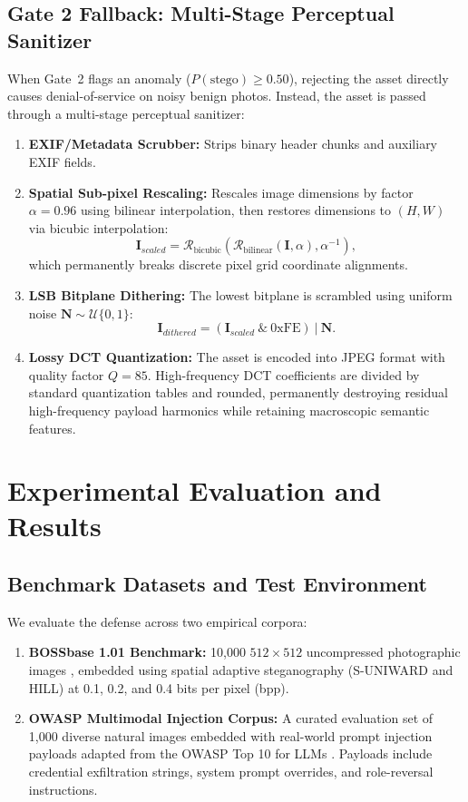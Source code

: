 \documentclass[conference]{IEEEtran}
\begin{document}
\subsection{Gate 2 Fallback: Multi-Stage Perceptual Sanitizer}
When Gate~2 flags an anomaly ($P(\text{stego}) \ge 0.50$), rejecting the asset directly causes denial-of-service on noisy benign photos. Instead, the asset is passed through a multi-stage perceptual sanitizer:
\begin{enumerate}
    \item \textbf{EXIF/Metadata Scrubber:} Strips binary header chunks and auxiliary EXIF fields.
    \item \textbf{Spatial Sub-pixel Rescaling:} Rescales image dimensions by factor $\alpha = 0.96$ using bilinear interpolation, then restores dimensions to $(H, W)$ via bicubic interpolation:
    \begin{equation}
        \mathbf{I}_{scaled} = \mathcal{R}_{\text{bicubic}}(\mathcal{R}_{\text{bilinear}}(\mathbf{I}, \alpha), \alpha^{-1}),
    \end{equation}
    which permanently breaks discrete pixel grid coordinate alignments.
    \item \textbf{LSB Bitplane Dithering:} The lowest bitplane is scrambled using uniform noise $\mathbf{N} \sim \mathcal{U}\{0, 1\}$:
    \begin{equation}
        \mathbf{I}_{dithered} = (\mathbf{I}_{scaled} \ \& \ \text{0xFE}) \ | \ \mathbf{N}.
    \end{equation}
    \item \textbf{Lossy DCT Quantization:} The asset is encoded into JPEG format with quality factor $Q = 85$. High-frequency DCT coefficients are divided by standard quantization tables and rounded, permanently destroying residual high-frequency payload harmonics while retaining macroscopic semantic features.
\end{enumerate}

\section{Experimental Evaluation and Results}
\label{sec:experiments}

\subsection{Benchmark Datasets and Test Environment}
We evaluate the defense across two empirical corpora:
\begin{enumerate}
    \item \textbf{BOSSbase 1.01 Benchmark:} 10,000 $512 \times 512$ uncompressed photographic images \cite{bas2011break}, embedded using spatial adaptive steganography (S-UNIWARD and HILL) at 0.1, 0.2, and 0.4 bits per pixel (bpp).
    \item \textbf{OWASP Multimodal Injection Corpus:} A curated evaluation set of 1,000 diverse natural images embedded with real-world prompt injection payloads adapted from the OWASP Top 10 for LLMs \cite{owasp2023top10}. Payloads include credential exfiltration strings, system prompt overrides, and role-reversal instructions.
\end{enumerate}
\end{document}
